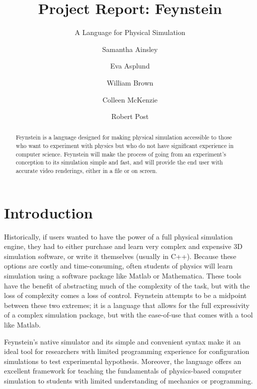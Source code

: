 
\title{Project Report: Feynstein}
\subtitle{A Language for Physical Simulation}

\author{Samantha Ainsley \and Eva Asplund \and William Brown \and
  Colleen McKenzie \and Robert Post}

\newtoggle{tutorial}
\newtoggle{manual}
\newtoggle{listing}

\toggletrue{tutorial}
\toggletrue{manual}
\toggletrue{listing}


\maketitle

\begin{abstract}
  Feynstein is a language designed for making physical simulation
  accessible to those who want to experiment with physics but who do not
  have significant experience in computer science. Feynstein will make
  the process of going from an experiment’s conception to its simulation
  simple and fast, and will provide the end user with accurate video
  renderings, either in a file or on screen.
\end{abstract}

\tableofcontents

\section{Introduction}

Historically, if users wanted to have the power of a full physical
simulation engine, they had to either purchase and learn very complex
and expensive 3D simulation software, or write it themselves (usually
in C++). Because these options are costly and time-consuming, often
students of physics will learn simulation using a software package
like Matlab or Mathematica. These tools have the benefit of
abstracting much of the complexity of the task, but with the loss of
complexity comes a loss of control. Feynstein attempts to be a
midpoint between these two extremes; it is a language that allows for
the full expressivity of a complex simulation package, but with the
ease-of-use that comes with a tool like Matlab.

Feynstein’s native simulator and its simple and convenient syntax make
it an ideal tool for researchers with limited programming experience
for configuration simulations to test experimental
hypothesis. Moreover, the language offers an excellent framework for
teaching the fundamentals of physics-based computer simulation to
students with limited understanding of mechanics or programming.


